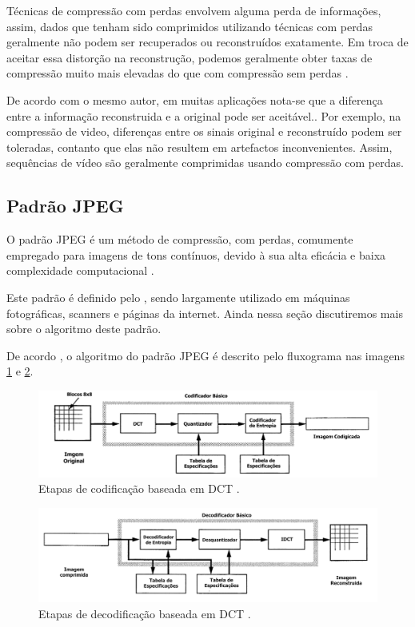 Técnicas de compressão com perdas envolvem alguma perda de informações, assim, dados que tenham sido comprimidos utilizando técnicas com perdas geralmente não podem ser recuperados ou reconstruídos exatamente. Em troca de aceitar essa distorção na reconstrução, podemos geralmente obter taxas de compressão muito mais elevadas do que com compressão sem perdas  \cite{sayood2012introduction}.

De acordo com o mesmo autor, em muitas aplicações nota-se que a diferença entre a informação reconstruida e a original pode ser aceitável.. Por exemplo, na compressão de video, diferenças entre os sinais original e reconstruído podem ser toleradas, contanto que elas não resultem em artefactos inconvenientes. Assim, sequências de vídeo são geralmente comprimidas usando compressão com perdas.

\subsection{Padrão JPEG} \label{JPEG}
 O padrão JPEG é um método de compressão, com perdas, comumente empregado para imagens de tons contínuos, devido à sua alta eficácia e baixa complexidade computacional \cite{wang2008jpeg}.
 
Este padrão é definido pelo , sendo largamente utilizado em máquinas fotográficas, scanners e páginas da internet. Ainda nessa seção discutiremos mais sobre o algoritmo deste padrão.

De acordo , o algoritmo do padrão JPEG é descrito pelo fluxograma nas imagens \ref{ENCODER_JPEG} e \ref{DECODER_JPEG}.

\begin{figure}[h]
	\centering
	\includegraphics[scale=0.55]{figuras/ENCODER-JPEG.pdf}
	\caption{Etapas de codificação baseada em DCT \cite{wallace1991jpeg}.}
	\label{ENCODER_JPEG}
\end{figure}

\begin{figure}[h]
	\centering
	\includegraphics[scale=0.55]{figuras/DECODER-JPEG.pdf}
	\caption{Etapas de decodificação baseada em DCT \cite{wallace1991jpeg}.}
	\label{DECODER_JPEG}
\end{figure}
  
